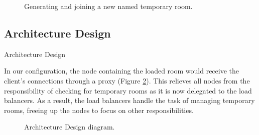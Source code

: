 \begin{figure}
  \centering
  \caption{\label{Figure::edge} Generating and joining a new named temporary room.}
\end{figure}


\newpage

\subsection{Architecture Design}
Architecture Design

In our configuration, the node containing the loaded room would receive the client's connections through a proxy (Figure \ref{Figure::architecture}). This relieves all nodes from the responsibility of checking for temporary rooms as it is now delegated to the load balancers. As a result, the load balancers handle the task of managing temporary rooms, freeing up the nodes to focus on other responsibilities.

\begin{figure}
  \centering
  \caption{\label{Figure::architecture} Architecture Design diagram.}
\end{figure}

